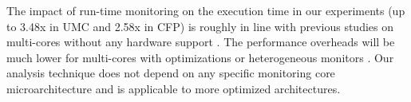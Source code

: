 The impact of run-time monitoring on the execution time in our experiments
(up to 3.48x in UMC and 2.58x in CFP) is roughly in line with previous studies
on multi-cores without any hardware support \cite{chen08-lba, nagarajan08-dift}. 
The performance overheads will be much lower for multi-cores with optimizations 
\cite{chen08-lba} or heterogeneous monitors \cite{flexcore-micro10}. 
Our analysis technique does not depend on any specific monitoring core
microarchitecture and is applicable to more optimized architectures.


